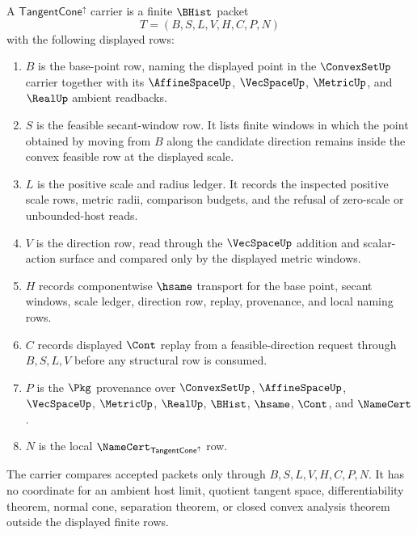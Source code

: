 \begin{definition}
\label{def:tangent-cone-carrier}
A $\mathsf{TangentCone}^{\uparrow}$ carrier is a finite $\BHist$ packet
$$
T=(B,S,L,V,H,C,P,N)
$$
with the following displayed rows:
\begin{enumerate}
\item $B$ is the base-point row, naming the displayed point in the $\ConvexSetUp$ carrier together with its $\AffineSpaceUp$, $\VecSpaceUp$, $\MetricUp$, and $\RealUp$ ambient readbacks.
\item $S$ is the feasible secant-window row. It lists finite windows in which the point obtained by moving from $B$ along the candidate direction remains inside the convex feasible row at the displayed scale.
\item $L$ is the positive scale and radius ledger. It records the inspected positive scale rows, metric radii, comparison budgets, and the refusal of zero-scale or unbounded-host reads.
\item $V$ is the direction row, read through the $\VecSpaceUp$ addition and scalar-action surface and compared only by the displayed metric windows.
\item $H$ records componentwise $\hsame$ transport for the base point, secant windows, scale ledger, direction row, replay, provenance, and local naming rows.
\item $C$ records displayed $\Cont$ replay from a feasible-direction request through $B,S,L,V$ before any structural row is consumed.
\item $P$ is the $\Pkg$ provenance over $\ConvexSetUp$, $\AffineSpaceUp$, $\VecSpaceUp$, $\MetricUp$, $\RealUp$, $\BHist$, $\hsame$, $\Cont$, and $\NameCert$.
\item $N$ is the local $\NameCert_{\mathsf{TangentCone}^{\uparrow}}$ row.
\end{enumerate}
The carrier compares accepted packets only through $B,S,L,V,H,C,P,N$. It has no coordinate for an ambient host limit, quotient tangent space, differentiability theorem, normal cone, separation theorem, or closed convex analysis theorem outside the displayed finite rows.
\end{definition}

